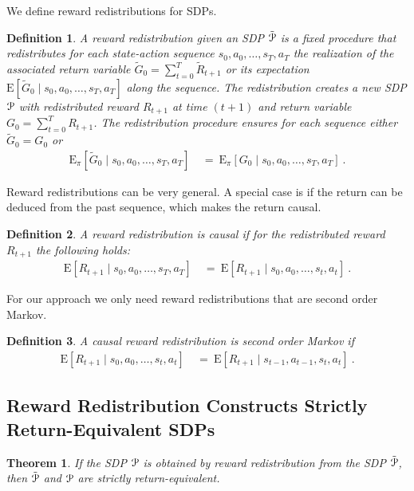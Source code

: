 \documentclass{article}
\newtheorem{theoremA}{Theorem}
\newtheorem{definitionA}{Definition}
\newcommand\EXP{\mathbf{\mathrm{E}}}
\begin{document}
\begin{appendices}
We define reward redistributions for SDPs.
\begin{definitionA}
A {\em reward redistribution} given an SDP $\tilde{\mathcal{P}}$ 
is a fixed procedure that redistributes 
for each state-action sequence $s_0,a_0,\ldots,s_T,a_T$ the realization of 
the associated return variable 
$\tilde{G}_0 = \sum_{t=0}^{T}  \tilde{R}_{t+1}$ 
or its expectation $\EXP \left[\tilde{G}_0 \mid s_0,a_0,\ldots,s_T,a_T \right]$
along the sequence. 
The redistribution creates a new SDP $\mathcal{P}$ with
redistributed reward $R_{t+1}$ at time $(t+1)$ and return variable
$G_0 = \sum_{t=0}^{T} R_{t+1}$.
The redistribution procedure 
ensures for each sequence either $\tilde{G}_0 = G_0$
or 
\begin{align}
   \EXP_{\pi} \left[
    \tilde{G}_0 \mid s_0,a_0,\ldots,s_T,a_T \right] \ &= \
   \EXP_{\pi} \left[
    G_0 \mid s_0,a_0,\ldots,s_T, a_T\right] \ .
\end{align}
\end{definitionA}


Reward redistributions can be very general.
A special case is if the return can be deduced from the past sequence, 
which makes the return causal. 
\begin{definitionA}
A reward redistribution is {\em causal} if for the redistributed
reward $R_{t+1}$ the following holds:
\begin{align}
   \EXP \left[ R_{t+1} \mid s_0,a_0,\ldots,s_T,a_T \right] \ &= \ 
   \EXP \left[ R_{t+1} \mid s_0,a_0,\ldots,s_t,a_t \right]\ .
\end{align}
\end{definitionA}

For our approach we only need reward redistributions that are
second order Markov.
\begin{definitionA}
A causal reward redistribution is {\em second order Markov} if
\begin{align}
   \EXP \left[ R_{t+1} \mid s_0,a_0,\ldots,s_t,a_t \right] \ &= \ 
   \EXP \left[ R_{t+1} \mid s_{t-1},a_{t-1},s_t,a_t \right] \ .
\end{align}
\end{definitionA}



\subsection{Reward Redistribution Constructs Strictly Return-Equivalent SDPs}

\begin{theoremA}
\label{th:AsdpEquiv}
If the SDP $\mathcal{P}$ is obtained by reward redistribution from the 
SDP $\tilde{\mathcal{P}}$, then $\tilde{\mathcal{P}}$ and $\mathcal{P}$ are strictly return-equivalent.
\end{theoremA}


\end{appendices}
\end{document}
